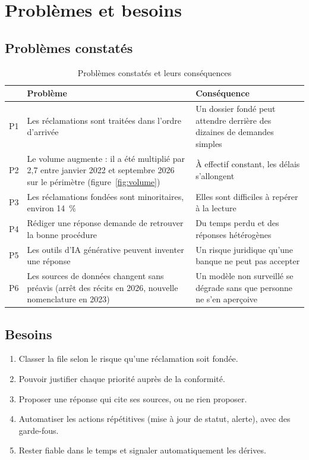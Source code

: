 \documentclass[11pt,a4paper]{article}
\begin{document}
\section{Problèmes et besoins}

\subsection{Problèmes constatés}

\begin{table}[H]
\centering\small
\begin{tabularx}{\linewidth}{@{}l Y Y@{}}
\toprule
& Problème & Conséquence \\
\midrule
P1 & Les réclamations sont traitées dans l'ordre d'arrivée & Un dossier fondé peut attendre derrière des dizaines de demandes simples \\
P2 & Le volume augmente : il a été multiplié par 2,7 entre janvier 2022 et septembre 2026 sur le périmètre (figure~\ref{fig:volume}) & À effectif constant, les délais s'allongent \\
P3 & Les réclamations fondées sont minoritaires, environ 14~\% & Elles sont difficiles à repérer à la lecture \\
P4 & Rédiger une réponse demande de retrouver la bonne procédure & Du temps perdu et des réponses hétérogènes \\
P5 & Les outils d'IA générative peuvent inventer une réponse & Un risque juridique qu'une banque ne peut pas accepter \\
P6 & Les sources de données changent sans préavis (arrêt des récits en 2026, nouvelle nomenclature en 2023) & Un modèle non surveillé se dégrade sans que personne ne s'en aperçoive \\
\bottomrule
\end{tabularx}
\caption{Problèmes constatés et leurs conséquences}
\end{table}

\subsection{Besoins}

\begin{enumerate}[label=B\arabic*.]
  \item Classer la file selon le risque qu'une réclamation soit fondée.
  \item Pouvoir justifier chaque priorité auprès de la conformité.
  \item Proposer une réponse qui cite ses sources, ou ne rien proposer.
  \item Automatiser les actions répétitives (mise à jour de statut, alerte), avec des garde-fous.
  \item Rester fiable dans le temps et signaler automatiquement les dérives.
\end{enumerate}
\end{document}

